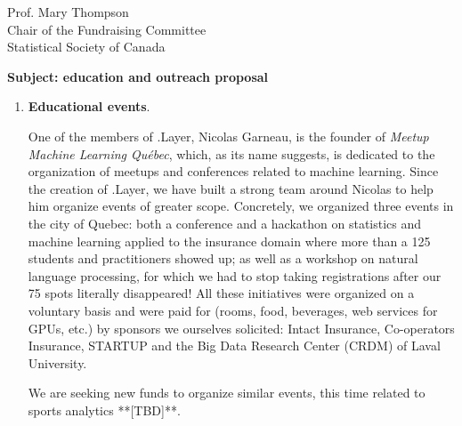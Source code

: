\documentclass[11pt, a4paper]{letter} %
\begin{document}
\begin{letter}{
	Prof. Mary Thompson\\
	Chair of the Fundraising Committee\\
	Statistical Society of Canada
	
	\bigskip
	\textbf{Subject: education and outreach proposal}%
}
\begin{enumerate}
	\quad We are lucky to have among us a professional graphic designer, Jean-Christophe Yelle, who created, at no cost, the logo that you can see in the head of the letter. We are now working on a bilingual display of the website (en/fr). So far, some of the articles are in English, some in French. In order to be as inclusive as possible, we would like to have the important posts in both languages. Of course, we can do it ourselves, which we will do; but a little help from a professional, at least for reviewing our translations, would be of great use. Among the other things we wish to integrate to the community are personalized e-mail addresses (@dotlayer.org) for the administering members and +++++++ [help spreading the word! *social media expert*]. These services, although not particularly expensive, are not free. To pay them, we intend to ask a small contribution from our members, as well as getting funds from sponsors. Paying such fee however, will never be required for contributing to the blog or participating to any of the community's activities. We seek your support here to keep the membership fee as low as possible.
	
	\bigskip
	\emph{Member in charge:} Stéphane Caron\\
	
	\item \textbf{Educational events}.
	
	\quad One of the members of .Layer, Nicolas Garneau, is the founder of \emph{Meetup	Machine Learning Québec}, which, as its name suggests, is dedicated to the organization of meetups and conferences related to machine learning. Since the creation of .Layer, we have built a strong team around Nicolas to help him organize events of greater scope. Concretely, we organized three events in the city of Quebec: both a conference and a hackathon on statistics and machine learning applied to the insurance domain where more than a 125 students and practitioners showed up; as well as a workshop on natural language processing, for which we had to stop taking registrations after our 75 spots literally disappeared! All these initiatives were organized on a voluntary basis and were paid for (rooms, food, beverages, web services for GPUs, etc.) by sponsors we ourselves solicited: Intact Insurance, Co-operators Insurance, STARTUP and the Big Data Research Center (CRDM) of Laval University.
	
\quad We are seeking new funds to organize similar events, this time related to sports analytics **[TBD]**.
	

\end{enumerate}
\end{letter}
\end{document}
